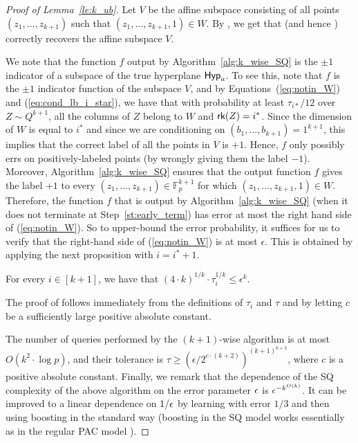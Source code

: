 \begin{proof}[Proof of Lemma~\ref{le:k_ub}]
Let $V$ be the affine subspace consisting of all points $(z_1,\dots,z_{k+1})$ such that $(z_1,\dots,z_{k+1},1) \in W$. By , we get that  (and hence ) correctly recovers the affine subspace $V$.

We note that the function $f$ output by Algorithm~\ref{alg:k_wise_SQ} is the $\pm 1$ indicator of a subspace of the true hyperplane $\mathsf{Hyp}_a$. To see this, note that $f$ is the $\pm 1$ indicator function of the subspace $V$, and by Equations~(\ref{eq:notin_W}) and (\ref{eq:cond_lb_i_star}), we have that with probability at least $\tau_{i*}/12$ over $Z \sim Q^{k+1}$, all the columns of $Z$ belong to $W$ and $\mathsf{rk}(Z) = i^*$. Since the dimension of $W$ is equal to $i^*$ and since we are conditioning on $(b_1,\dots,b_{k+1})=1^{k+1}$, this implies that the correct label of all the points in $V$ is $+1$. Hence, $f$ only possibly errs on positively-labeled points (by wrongly giving them the label $-1$). Moreover, Algorithm~\ref{alg:k_wise_SQ} ensures that the output function $f$ gives the label $+1$ to every $(z_1,\dots,z_{k+1}) \in \mathbb{F}_p^{k+1}$ for which $(z_1,\dots,z_{k+1},1) \in W$. Therefore, the function $f$ that is output by Algorithm~\ref{alg:k_wise_SQ} (when it does not terminate at Step~\ref{st:early_term}) has error at most the right hand side of (\ref{eq:notin_W}). So to upper-bound the error probability, it suffices for us to verify that the right-hand side of (\ref{eq:notin_W}) is at most $\epsilon$. This is obtained by applying the next proposition with $i = i^*+1$.
\begin{proposition}\label{prop:tau_i_pow_1_ov_k}
	For every $i \in [k+1]$, we have that $(4 \cdot k)^{1/k} \cdot \tau_{i}^{1/k} \le \epsilon^{k} $.
\end{proposition}

The proof of  follows immediately from the definitions of $\tau_{i}$ and $\tau$ and by letting $c$ be a sufficiently large positive absolute constant.

The number of queries performed by the $(k+1)$-wise algorithm is at most $O(k^2 \cdot \log{p})$, and their tolerance is $\tau \geq (\epsilon/2^{c\cdot(k+2)})^{(k+1)^{k+3}}$, where $c$ is a positive absolute constant. Finally, we remark that the dependence of the SQ complexity of the above algorithm on the error parameter $\epsilon$ is $\epsilon^{-k^{O(k)}}$. It can be improved to a linear dependence on $1/\epsilon$ by learning with error $1/3$ and then using boosting in the standard way (boosting in the SQ model works essentially as in the regular PAC model \cite{aslam1993general}).
\end{proof}

